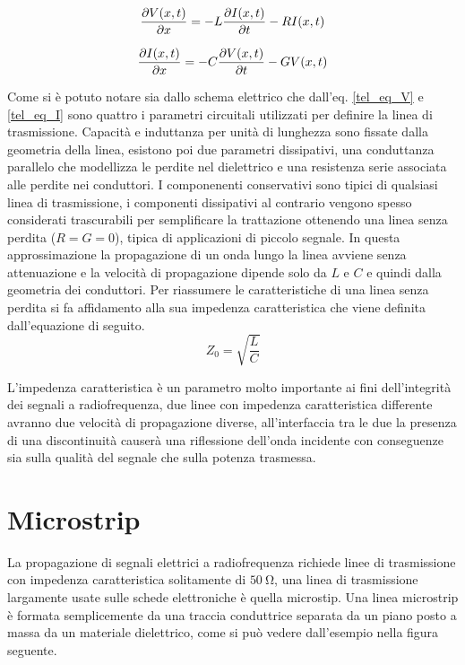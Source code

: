 \documentclass[12pt,oneside]{book}
\begin{document}
\begin{equation}
    \pdv{V(x,t)}{x}=-L\pdv{I(x,t)}{t}-RI(x,t)
    \label{tel_eq_V}
\end{equation} 

\begin{equation}
    \pdv{I(x,t)}{x}=-C\pdv{V(x,t)}{t}-GV(x,t)
    \label{tel_eq_I}
\end{equation} 





Come si è potuto notare sia dallo schema elettrico che dall'eq. \eqref{tel_eq_V} e \eqref{tel_eq_I} sono quattro i parametri circuitali utilizzati per definire la linea di trasmissione. Capacità e induttanza per unità di lunghezza sono fissate dalla geometria della linea, esistono poi due parametri dissipativi, una conduttanza parallelo che modellizza le perdite nel dielettrico e una resistenza serie associata alle perdite nei conduttori. I componenenti conservativi sono tipici di qualsiasi linea di trasmissione, i componenti dissipativi al contrario vengono spesso considerati trascurabili per semplificare la trattazione ottenendo una linea senza perdita ($R=G=0$), tipica di applicazioni di piccolo segnale. In questa approssimazione la propagazione di un onda lungo la linea avviene senza attenuazione e la velocità di propagazione dipende solo da $L$ e $C$ e quindi dalla geometria dei conduttori. Per riassumere le caratteristiche di una linea senza perdita si fa affidamento alla sua impedenza caratteristica che viene definita dall'equazione di seguito.
\begin{equation}
    Z_0=\sqrt{\dfrac{L}{C}}
\end{equation}

L'impedenza caratteristica è un parametro molto importante ai fini dell'integrità dei segnali a radiofrequenza, due linee con impedenza caratteristica differente avranno due velocità di propagazione diverse, all'interfaccia tra le due la presenza di una discontinuità causerà una riflessione dell'onda incidente con conseguenze sia sulla qualità del segnale che sulla potenza trasmessa.

\section{Microstrip}
La propagazione di segnali elettrici a radiofrequenza richiede linee di trasmissione con impedenza caratteristica solitamente di $\SI{50}{\ohm}$, una linea di trasmissione largamente usate sulle schede elettroniche è quella microstip. Una linea microstrip è formata semplicemente da una traccia conduttrice separata da un piano posto a massa da un materiale dielettrico, come si può vedere dall'esempio nella figura seguente.
\end{document}
